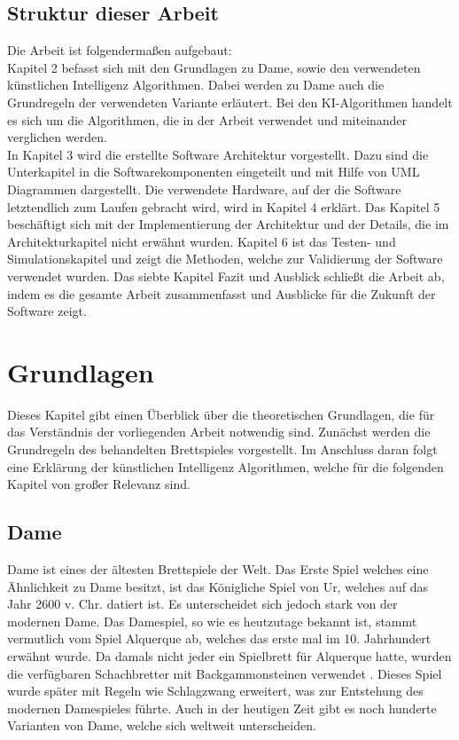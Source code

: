\documentclass[12pt,a4paper,bibliography=totocnumbered,listof=totocnumbered]{article}
\begin{document}
\subsection{Struktur dieser Arbeit}
Die Arbeit ist folgendermaßen aufgebaut: \\
Kapitel 2 befasst sich mit den Grundlagen zu Dame, sowie den verwendeten 
künstlichen Intelligenz Algorithmen. Dabei werden zu Dame auch die Grundregeln der
verwendeten Variante erläutert. Bei den \ac{KI}-Algorithmen handelt es sich um die Algorithmen, die in 
der Arbeit verwendet und miteinander verglichen werden. \\
In Kapitel 3 wird die erstellte Software Architektur vorgestellt. Dazu sind die Unterkapitel 
in die Softwarekomponenten eingeteilt und mit Hilfe von UML Diagrammen dargestellt. 
Die verwendete Hardware, auf der die Software letztendlich zum Laufen gebracht wird, 
wird in Kapitel 4 erklärt. Das Kapitel 5 beschäftigt sich mit der Implementierung der 
Architektur und der Details, die im Architekturkapitel nicht erwähnt wurden. 
Kapitel 6 ist das Testen- und Simulationskapitel und zeigt die Methoden, welche 
zur Validierung der Software verwendet wurden.
Das siebte Kapitel Fazit und Ausblick schließt die Arbeit ab, indem es die gesamte 
Arbeit zusammenfasst und Ausblicke für die Zukunft der Software zeigt.

\pagebreak
\section{Grundlagen}
\label{chap:Grundlagen}
Dieses Kapitel gibt einen Überblick über die theoretischen Grundlagen, die für das Verständnis 
der vorliegenden Arbeit notwendig sind. Zunächst werden die Grundregeln des behandelten Brettspieles 
vorgestellt. Im Anschluss daran folgt eine Erklärung der künstlichen Intelligenz Algorithmen, welche für 
die folgenden Kapitel von großer Relevanz sind. \cite{KuenstlicheIntelligenzNorvig}

\subsection{Dame}
Dame ist eines der ältesten Brettspiele der Welt. Das Erste Spiel welches eine Ähnlichkeit zu Dame besitzt, ist das Königliche
Spiel von Ur, welches auf das Jahr 2600 v. Chr. datiert ist. Es unterscheidet sich jedoch stark von der modernen Dame.
Das Damespiel, so wie es heutzutage bekannt ist, stammt vermutlich vom Spiel Alquerque ab, welches das erste mal im 10. 
Jahrhundert erwähnt wurde. Da damals nicht jeder ein Spielbrett für Alquerque 
hatte, wurden die verfügbaren Schachbretter mit Backgammonsteinen verwendet \cite{SpieleDerWelt}.
Dieses Spiel wurde später mit Regeln wie Schlagzwang erweitert, was zur Entstehung des modernen Damespieles führte.
Auch in der heutigen Zeit gibt es noch hunderte Varianten von Dame, welche sich weltweit unterscheiden.
\end{document}
